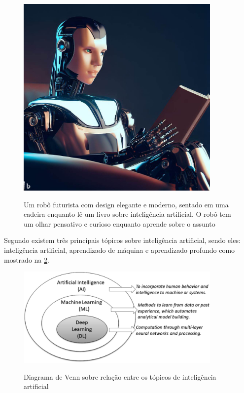 \begin{figure}[H]
	\caption{Um robô futurista com design elegante e moderno, sentado em uma cadeira enquanto lê um livro sobre inteligência artificial. O robô tem um olhar pensativo e curioso enquanto aprende sobre o assunto}
	\centering %
	\includegraphics[width=10cm]{figures/ia_concept.jpg} %
	\label{fig:ia_concept}
\end{figure}

Segundo  existem três principais tópicos sobre inteligência artificial, sendo eles: inteligência artificial, aprendizado de máquina e aprendizado profundo como mostrado na \cref{fig:diagrama_ia_ml_dp}.

\begin{figure}[H]
	\caption{Diagrama de Venn sobre relação entre os tópicos de inteligência artificial}
	\centering %
	\includegraphics[width=10cm]{figures/diagrama_ia_ml_dp.png} %
	\label{fig:diagrama_ia_ml_dp}
\end{figure}

